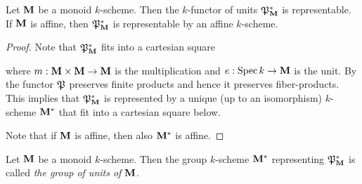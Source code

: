 \begin{proposition}
Let $\mathbf{M}$ be a monoid $k$-scheme. Then the $k$-functor of units ${\mathfrak P}_{\mathbf{M}}^*$ is representable. If $\mathbf{M}$ is affine, then ${\mathfrak P}_{\mathbf{M}}^*$ is representable by an affine $k$-scheme.
\end{proposition}
\begin{proof}
Note that ${\mathfrak P}_{\mathbf{M}}^*$ fits into a cartesian square
\begin{center}
\end{center}
where $m:\mathbf{M}\times \mathbf{M}\rightarrow \mathbf{M}$ is the multiplication and $e:\mathrm{Spec}\, k\rightarrow \mathbf{M}$ is the unit. By {\cite[Fact 4.1]{kfunctors}} the functor ${\mathfrak P}$ preserves finite products and hence it preserves fiber-products. This implies that ${\mathfrak P}_{\mathbf{M}}^*$ is represented by a unique (up to an isomorphism) $k$-scheme $\mathbf{M}^*$ that fit into a cartesian square below.
\begin{center}
\end{center}
Note that if $\mathbf{M}$ is affine, then also $\mathbf{M}^*$ is affine.
\end{proof}

\begin{definition}
Let $\mathbf{M}$ be a monoid $k$-scheme. Then the group $k$-scheme $\mathbf{M}^*$ representing ${\mathfrak P}_{\mathbf{M}}^*$ is called \textit{the group of units of $\mathbf{M}$}.
\end{definition}


